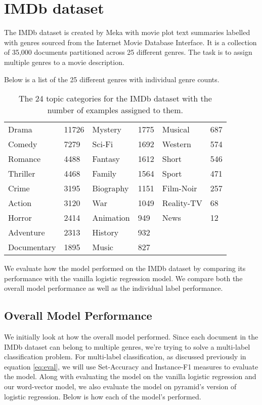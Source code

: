 \section{IMDb dataset}

The IMDb dataset is created by Meka with movie plot text summaries labelled with genres sourced from the Internet Movie Database Interface. It is a collection of 35,000 documents partitioned across 25 different genres. The task is to assign multiple genres to a movie description.

Below is a list of the 25 different genres with individual genre counts.

\begin{table}[htbp]
\centering
\begin{tabular}{ll|ll|ll}
Drama & 11726 & Mystery & 1775 & Musical & 687 \\
Comedy & 7279 & Sci-Fi & 1692 & Western & 574 \\
Romance & 4488 & Fantasy & 1612 & Short & 546 \\
Thriller & 4468 & Family & 1564 & Sport & 471 \\
Crime & 3195 & Biography & 1151 & Film-Noir & 257 \\
Action & 3120 & War & 1049 & Reality-TV & 68 \\
Horror & 2414 & Animation & 949 & News & 12 \\
Adventure & 2313 & History & 932 &  &  \\
Documentary & 1895 & Music & 827 &  & 
\end{tabular}
\caption{\label{tab:widgets}The 24 topic categories for the IMDb dataset with the number of examples assigned to them.}
\end{table}

We evaluate how the model performed on the IMDb dataset by comparing its performance with the vanilla logistic regression model. We compare both the overall model performance as well as the individual label performance.

\subsection{Overall Model Performance}

We initially look at how the overall model performed. Since each document in the IMDb dataset can belong to multiple genres, we're trying to solve a multi-label classification problem. For multi-label classification, as discussed previously in equation \ref{eq:eval}, we will use Set-Accuracy and Instance-F1 measures to evaluate the model. Along with evaluating the model on the vanilla logistic regression and our word-vector model, we also evaluate the model on pyramid's version of logistic regression. Below is how each of the model's performed.

